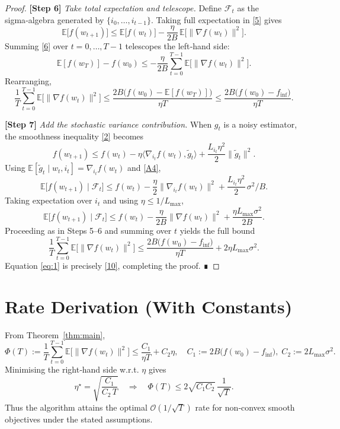 \documentclass{article}
\begin{document}
\begin{proof}
\noindent\textbf{[Step 6]} \emph{Take total expectation and telescope.}  
Define $\mathcal{F}_t$ as the sigma‑algebra generated by $\{i_0,\dots,i_{t-1}\}$. Taking full expectation in \eqref{5} gives
\[
\mathbb{E}\big[f(w_{t+1})\big]
\le
\mathbb{E}\big[f(w_t)\big]
- \frac{\eta}{2B}\,\mathbb{E}\!\big[\|\nabla f(w_t)\|^2\big] .
\tag{6}
\]
Summing \eqref{6} over $t=0,\dots,T-1$ telescopes the left‑hand side:
\[
\mathbb{E}[f(w_T)] - f(w_0)
\le
- \frac{\eta}{2B}\sum_{t=0}^{T-1}\mathbb{E}\!\big[\|\nabla f(w_t)\|^2\big] .
\tag{7}
\]
Rearranging,
\[
\frac{1}{T}\sum_{t=0}^{T-1}\mathbb{E}\!\big[\|\nabla f(w_t)\|^2\big]
\le
\frac{2B\big(f(w_0)-\mathbb{E}[f(w_T)]\big)}{\eta T}
\le
\frac{2B\big(f(w_0)-f_{\inf}\big)}{\eta T} .
\tag{8}
\]

\noindent\textbf{[Step 7]} \emph{Add the stochastic variance contribution.}  
When $g_t$ is a noisy estimator, the smoothness inequality \eqref{2} becomes
\[
f(w_{t+1}) \le f(w_t) - \eta\langle \nabla_{i_t}f(w_t),\tilde g_t\rangle
+ \frac{L_{i_t}\eta^2}{2}\|\tilde g_t\|^2 .
\]
Using $\mathbb{E}[\tilde g_t\mid w_t,i_t]=\nabla_{i_t}f(w_t)$ and \ref{A4},
\[
\mathbb{E}\!\big[f(w_{t+1})\mid \mathcal{F}_t\big]
\le
f(w_t) - \frac{\eta}{2}\|\nabla_{i_t}f(w_t)\|^2
+ \frac{L_{i_t}\eta^2}{2}\,\sigma^2/B .
\]
Taking expectation over $i_t$ and using $\eta\le 1/L_{\max}$,
\[
\mathbb{E}\!\big[f(w_{t+1})\mid \mathcal{F}_t\big]
\le
f(w_t) - \frac{\eta}{2B}\|\nabla f(w_t)\|^2
+ \frac{\eta L_{\max}\sigma^2}{2B}.
\tag{9}
\]
Proceeding as in Steps 5–6 and summing over $t$ yields the full bound
\[
\frac{1}{T}\sum_{t=0}^{T-1}\mathbb{E}\!\big[\|\nabla f(w_t)\|^2\big]
\le
\frac{2B\big(f(w_0)-f_{\inf}\big)}{\eta T}
+ 2\eta L_{\max}\sigma^2 .
\tag{10}
\]
Equation \eqref{eq:1} is precisely \eqref{10}, completing the proof. ∎
\end{proof}

\section*{Rate Derivation (With Constants)}
From Theorem~\ref{thm:main},
\[
\Phi(T):=
\frac{1}{T}\sum_{t=0}^{T-1}\mathbb{E}\!\big[\|\nabla f(w_t)\|^2\big]
\le
\frac{C_1}{\eta T}+C_2\eta,
\quad
C_1:=2B\big(f(w_0)-f_{\inf}\big),\;
C_2:=2L_{\max}\sigma^2 .
\]
Minimising the right‑hand side w.r.t. $\eta$ gives
\[
\eta^\star = \sqrt{\frac{C_1}{C_2\,T}}
\quad\Longrightarrow\quad
\Phi(T)\le 2\sqrt{C_1C_2}\,\frac{1}{\sqrt{T}} .
\]
Thus the algorithm attains the optimal $\mathcal{O}(1/\sqrt{T})$ rate for non‑convex smooth objectives under the stated assumptions.
\end{document}
